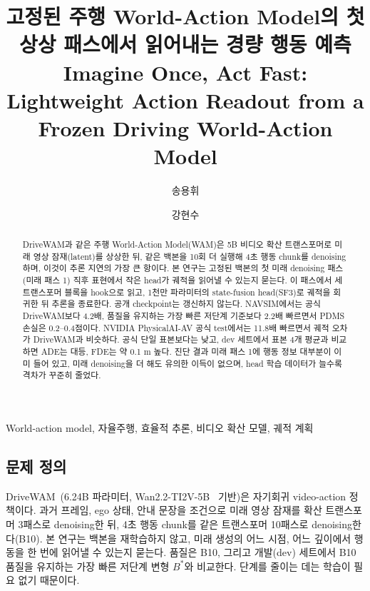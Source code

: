 \documentclass[nouppercase]{kaia}
\title{고정된 주행 World-Action Model의 첫 상상 패스에서 읽어내는 경량 행동 예측\\[2pt]
{\normalsize\normalfont Imagine Once, Act Fast: Lightweight Action Readout from a Frozen Driving World-Action Model}}
\author{송용휘}{a}
\author{강현수}{a}
\affiliation{충북대학교 정보통신공학부, 청주, 대한민국, \{thddydgnl1937@gmail.com, hskang@chungbuk.ac.kr\}}{a}
\begin{document}
\maketitle
\vspace{-28pt}

\begin{mdframed}

\begin{abstract}
DriveWAM과 같은 주행 World-Action Model(WAM)은 5B 비디오 확산 트랜스포머로 미래 영상 잠재(latent)를 상상한 뒤, 같은 백본을 10회 더 실행해 4초 행동 chunk를 denoising하며, 이것이 추론 지연의 가장 큰 항이다. 본 연구는 고정된 백본의 첫 미래 denoising 패스(미래 패스 1) 직후 표현에서 작은 head가 궤적을 읽어낼 수 있는지 묻는다. 이 패스에서 세 트랜스포머 블록을 hook으로 읽고, 1천만 파라미터의 state-fusion head(SF3)로 궤적을 회귀한 뒤 추론을 종료한다. 공개 checkpoint는 갱신하지 않는다. NAVSIM에서는 공식 DriveWAM보다 4.2배, 품질을 유지하는 가장 빠른 저단계 기준보다 2.2배 빠르면서 PDMS 손실은 0.2--0.4점이다. NVIDIA PhysicalAI-AV 공식 test에서는 11.8배 빠르면서 궤적 오차가 DriveWAM과 비슷하다. 공식 단일 표본보다는 낮고, dev 세트에서 표본 4개 평균과 비교하면 ADE는 대등, FDE는 약 0.1 m 높다. 진단 결과 미래 패스 1에 행동 정보 대부분이 이미 들어 있고, 미래 denoising을 더 해도 유의한 이득이 없으며, head 학습 데이터가 늘수록 격차가 꾸준히 줄었다.
\end{abstract}
\begin{keywords}
World-action model, 자율주행, 효율적 추론, 비디오 확산 모델, 궤적 계획
\end{keywords}

\subsection{문제 정의}
DriveWAM~\cite{shi2026drivewam}(6.24B 파라미터, Wan2.2-TI2V-5B~\cite{wan2025wan} 기반)은 자기회귀 video-action 정책이다. 과거 프레임, ego 상태, 안내 문장을 조건으로 미래 영상 잠재를 확산 트랜스포머 3패스로 denoising한 뒤, 4초 행동 chunk를 같은 트랜스포머 10패스로 denoising한다(B10). 본 연구는 백본을 재학습하지 않고, 미래 생성의 어느 시점, 어느 깊이에서 행동을 한 번에 읽어낼 수 있는지 묻는다. 품질은 B10, 그리고 개발(dev) 세트에서 B10 품질을 유지하는 가장 빠른 저단계 변형 $B^{*}$와 비교한다. 단계를 줄이는 데는 학습이 필요 없기 때문이다.


\end{mdframed}
\end{document}
